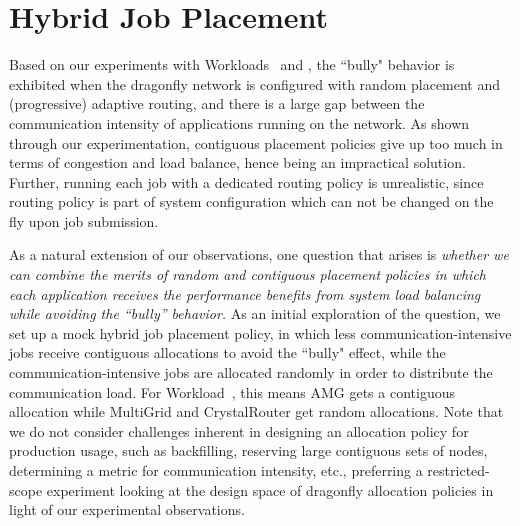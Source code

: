 \section{Hybrid Job Placement}
\label{sec: hybrid placement}

Based on our experiments with Workloads~ and , the ``bully" behavior is
exhibited when the dragonfly network is configured with random placement and
(progressive) adaptive routing, and there is a large gap between the
communication intensity of applications running on the network.
As shown through our experimentation, contiguous placement policies give up too
much in terms of congestion and load balance, hence being an impractical solution. 
Further, running each job with a dedicated routing policy is unrealistic, 
since routing policy is part of system configuration which can not be changed
on the fly upon job submission. 


As a natural extension of our observations, one question that arises is \emph{whether
we can combine the merits of random and contiguous placement policies in
which each application receives the performance benefits from system load
balancing while avoiding the ``bully'' behavior.} As an initial exploration of
the question, we set up a mock hybrid job placement policy, in which less
communication-intensive jobs receive contiguous allocations to avoid the
``bully" effect, while the communication-intensive jobs are allocated randomly
in order to distribute the communication load. For Workload~, this
means AMG gets a contiguous allocation while MultiGrid and CrystalRouter get
random allocations. Note that we do not consider challenges inherent in
designing an allocation policy for production usage, such as backfilling,
reserving large contiguous sets of nodes, determining a metric for
communication intensity, etc., preferring a restricted-scope experiment
looking at the design space of dragonfly allocation policies in light of our experimental
observations.


